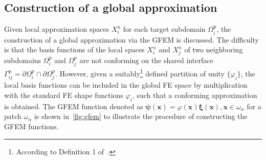 \documentclass[a4paper]{eccomas_paper-2024}
\newcommand{\p}{\mathrm{p}}
\begin{document}
\subsection{Construction of a global approximation} %
\label{sub:Construction of a global approximation}
Given local approximation spaces $X^n_i$ for each target subdomain $\varOmega_i^{\p}$, the construction of a global approximation via the GFEM is discussed.
The difficulty is that the basis functions of the local spaces $X^n_i$ and $X^n_j$ of two neighboring subdomains $\varOmega_i^{\p}$ and $\varOmega_j^{\p}$ are not conforming on the shared interface $\varGamma^{\p}_{ij}=\partial\varOmega_i^{\p}\cap\partial\varOmega_j^{\p}$.
However, given a suitably\footnote{According to Definition 1 of~\cite{BABUSKA1997}.} defined partition of unity $\{{\varphi}_i\}$, the local basis functions can be included in the global FE space by multiplication with the standard FE shape functions ${\varphi}_i$, such that a conforming approximation is obtained.
The GFEM function denoted as $\bm{\psi}(\bm{x}) = \varphi(\bm{x})\bm{\xi}(\bm{x}), \bm{x}\in\omega_{\alpha}$ for a patch $\omega_{\alpha}$ is shown in~\cref{fig:gfem} to illustrate the procedure of constructing the GFEM functions.
\end{document}
